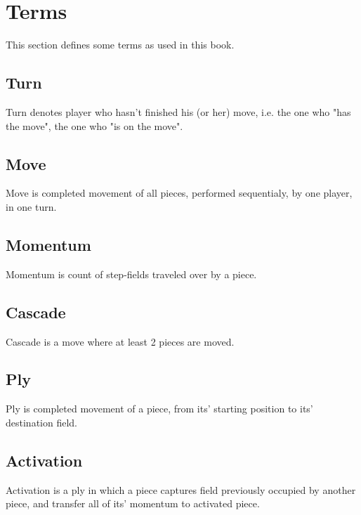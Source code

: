 

\chapter*{Terms}
\label{ch:Terms}
This section defines some terms as used in this book.

\section*{Turn}
\label{sec:Terms/Turn}
Turn denotes player who hasn't finished his (or her) move, i.e. the one who "has the move",
the one who "is on the move".

\section*{Move}
\label{sec:Terms/Move}
Move is completed movement of all pieces, performed sequentialy, by one player, in one turn.

\section*{Momentum}
\label{sec:Terms/Momentum}
Momentum is count of step-fields traveled over by a piece.

\section*{Cascade}
\label{sec:Terms/Cascade}
Cascade is a move where at least 2 pieces are moved.

\section*{Ply}
\label{sec:Terms/Ply}
Ply is completed movement of a piece, from its' starting position to its' destination field.

\section*{Activation}
\label{sec:Terms/Activation}
Activation is a ply in which a piece captures field previously occupied by another piece,
and transfer all of its' momentum to activated piece.


